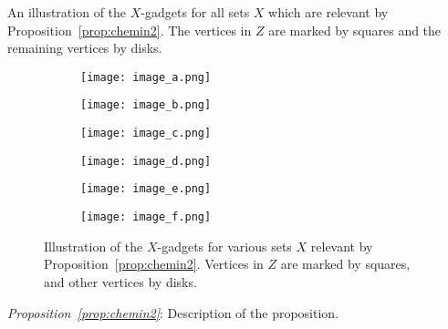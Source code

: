 \documentclass{article}
\begin{document}
An illustration of the \(X\)-gadgets for all sets \(X\) which are relevant by Proposition~\ref{prop:chemin2}. The vertices in \(Z\) are marked by squares and the remaining vertices by disks.

\begin{figure}[h]
    \centering
    \begin{subfigure}{0.3\textwidth}
        \centering
        \texttt{[image: image\_a.png]} %
        \caption{}
        \label{fig:image_a}
    \end{subfigure}%
    \hfill
    \begin{subfigure}{0.3\textwidth}
        \centering
        \texttt{[image: image\_b.png]} %
        \caption{}
        \label{fig:image_b}
    \end{subfigure}%
    \hfill
    \begin{subfigure}{0.3\textwidth}
        \centering
        \texttt{[image: image\_c.png]} %
        \caption{}
        \label{fig:image_c}
    \end{subfigure}%

    \bigskip

    \begin{subfigure}{0.3\textwidth}
        \centering
        \texttt{[image: image\_d.png]} %
        \caption{}
        \label{fig:image_d}
    \end{subfigure}%
    \hfill
    \begin{subfigure}{0.3\textwidth}
        \centering
        \texttt{[image: image\_e.png]} %
        \caption{}
        \label{fig:image_e}
    \end{subfigure}%
    \hfill
    \begin{subfigure}{0.3\textwidth}
        \centering
        \texttt{[image: image\_f.png]} %
        \caption{}
        \label{fig:image_f}
    \end{subfigure}
    
    \caption{Illustration of the \(X\)-gadgets for various sets \(X\) relevant by Proposition~\ref{prop:chemin2}. Vertices in \(Z\) are marked by squares, and other vertices by disks.}
    \label{fig:X_gadgets}
\end{figure}

\begin{thebibliography}{9}
     \emph{Proposition~\ref{prop:chemin2}}: Description of the proposition.
\end{thebibliography}
\end{document}
